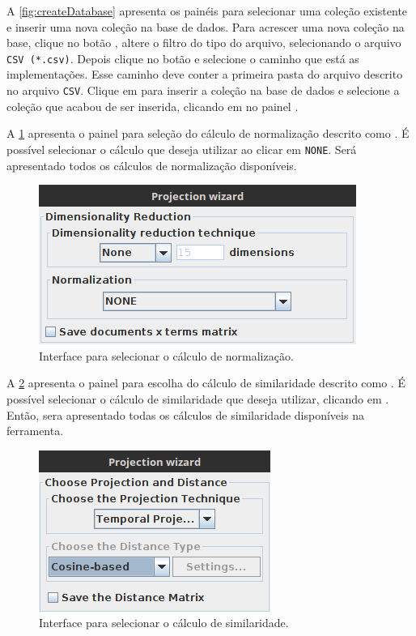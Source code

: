 		A \cref{fig:createDatabase} apresenta os painéis para selecionar uma coleção existente
		e inserir uma nova coleção na base de dados. Para acrescer uma nova coleção na base,
		clique no botão , altere o filtro do tipo do arquivo, selecionando
		o arquivo \texttt{CSV (*.csv)}. Depois clique no botão  e selecione
		o caminho que está as implementações. Esse caminho deve conter a primeira pasta do
		arquivo descrito no arquivo \texttt{CSV}. Clique em  para inserir a
		coleção na base de dados e selecione a coleção que acabou de ser inserida, clicando
		em  no painel .
		
		A \cref{fig:normalizacao} apresenta o painel para seleção do cálculo de normalização
		descrito como . É possível selecionar o cálculo que deseja
		utilizar ao clicar em \texttt{NONE}. Será apresentado todos os cálculos de
		normalização disponíveis.
		
		\begin{figure}
			\centering
			\includegraphics[width=0.5\linewidth]{imagem/normalizacao}
			\caption{Interface para selecionar o cálculo de normalização.}
			\label{fig:normalizacao}
		\end{figure}
		
		A \cref{fig:similaridade} apresenta o painel para escolha do cálculo de similaridade
		descrito como . É possível selecionar o cálculo de
		similaridade que deseja utilizar, clicando em . Então, sera
		apresentado todas os cálculos de similaridade disponíveis na ferramenta.
		
		\begin{figure}
			\centering
			\includegraphics[width=0.35\linewidth]{imagem/similaridade}
			\caption{Interface para selecionar o cálculo de similaridade.}
			\label{fig:similaridade}
		\end{figure}
		
